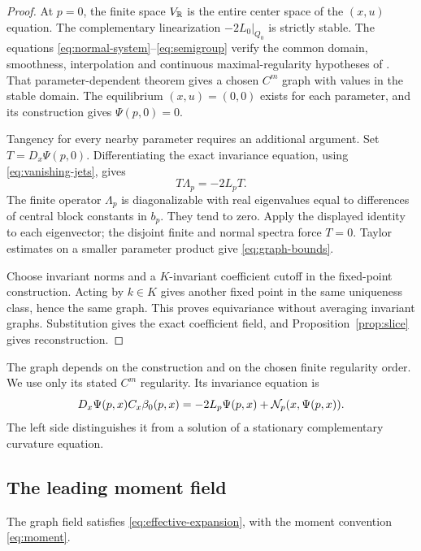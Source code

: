 \begin{proof}
At $p=0$, the finite space $V_{\mathbb R}$ is the entire center
space of the $(x,u)$ equation. The complementary linearization
$-2L_0|_{Q_0}$ is strictly stable. The equations
\eqref{eq:normal-system}--\eqref{eq:semigroup} verify the common
domain, smoothness, interpolation and continuous maximal-regularity
hypotheses of \cite[Theorem~2.1]{simonett1994}.
That parameter-dependent theorem gives a chosen $C^m$ graph
with values in the stable domain. The equilibrium $(x,u)=(0,0)$
exists for each parameter, and its construction gives
$\Psi(p,0)=0$.

Tangency for every nearby parameter requires an additional
argument. Set $T=D_x\Psi(p,0)$. Differentiating the exact
invariance equation, using \eqref{eq:vanishing-jets}, gives
\[
 T\Lambda_p=-2L_pT.
\]
The finite operator $\Lambda_p$ is diagonalizable with real
eigenvalues equal to differences of central block constants
in $b_p$. They tend to zero. Apply the displayed identity to
each eigenvector; the disjoint finite and normal spectra force
$T=0$. Taylor estimates on a smaller parameter product give
\eqref{eq:graph-bounds}.

Choose invariant norms and a $K$-invariant coefficient cutoff
in the fixed-point construction. Acting by $k\in K$ gives
another fixed point in the same uniqueness class, hence the
same graph. This proves equivariance without averaging
invariant graphs. Substitution gives the exact coefficient
field, and Proposition~\ref{prop:slice} gives reconstruction.
\end{proof}

The graph depends on the construction and on the chosen finite
regularity order. We use only its stated $C^m$ regularity.
Its invariance equation is
\begin{equation}\label{eq:invariance}
 D_x\Psi(p,x)C_x\beta_0(p,x)
          =-2L_p\Psi(p,x)+\mathcal N_p(x,\Psi(p,x)).
\end{equation}
The left side distinguishes it from a solution of a stationary
complementary curvature equation.

\subsection{The leading moment field}
\begin{proposition}\label{prop:moment}
The graph field satisfies \eqref{eq:effective-expansion},
with the moment convention \eqref{eq:moment}.
\end{proposition}

